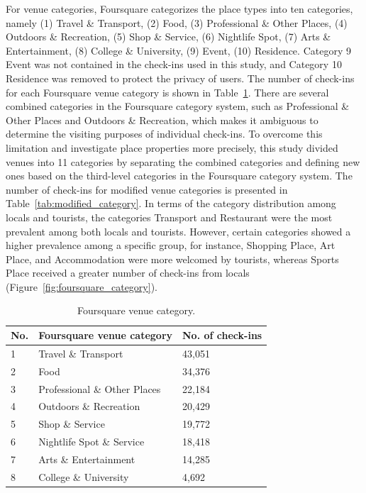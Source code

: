 \documentclass{article}
\begin{document}
For venue categories, Foursquare categorizes the place types into ten categories, namely (1) Travel \& Transport, (2) Food, (3) Professional \& Other Places, (4) Outdoors \& Recreation, (5) Shop \& Service, (6) Nightlife Spot, (7) Arts \& Entertainment, (8) College \& University, (9) Event, (10) Residence. Category 9 Event was not contained in the check-ins used in this study, and Category 10 Residence was removed to protect the privacy of users. The number of check-ins for each Foursquare venue category is shown in Table~\ref{tab:foursquare_category}. There are several combined categories in the Foursquare category system, such as Professional \& Other Places and Outdoors \& Recreation, which makes it ambiguous to determine the visiting purposes of individual check-ins. To overcome this limitation and investigate place properties more precisely, this study divided venues into 11 categories by separating the combined categories and defining new ones based on the third-level categories in the Foursquare category system. The number of check-ins for modified venue categories is presented in Table~\ref{tab:modified_category}. In terms of the category distribution among locals and tourists, the categories Transport and Restaurant were the most prevalent among both locals and tourists. However, certain categories showed a higher prevalence among a specific group, for instance, Shopping Place, Art Place, and Accommodation were more welcomed by tourists, whereas Sports Place received a greater number of check-ins from locals (Figure~\ref{fig:foursquare_category}).

\begin{table}[h!]
\centering
\caption{\label{tab:foursquare_category}Foursquare venue category.}
\begin{tabular}{lll} \hline
No. & Foursquare venue category & No. of check-ins \\ \hline
1 & Travel \& Transport & 43,051 \\
2 & Food & 34,376 \\
3 & Professional \& Other Places & 22,184 \\
4 & Outdoors \& Recreation & 20,429 \\
5 & Shop \& Service & 19,772 \\
6 & Nightlife Spot \& Service & 18,418 \\
7 & Arts \& Entertainment & 14,285 \\
8 & College \& University & 4,692 \\ \hline
\end{tabular}
\end{table}
\end{document}
